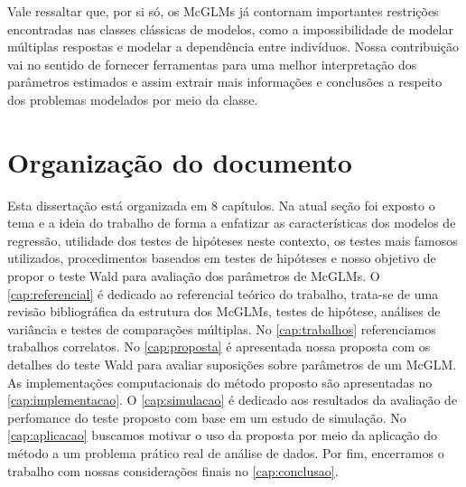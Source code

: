 Vale ressaltar que, por si só, os McGLMs já contornam importantes restrições encontradas nas classes clássicas de modelos, como a impossibilidade de modelar múltiplas respostas e modelar a dependência entre indivíduos. Nossa contribuição vai no sentido de fornecer ferramentas para uma melhor interpretação dos parâmetros estimados e assim extrair mais informações e conclusões a respeito dos problemas modelados por meio da classe.


\section{Organização do documento}

Esta dissertação está organizada em 8 capítulos. Na atual seção foi exposto o tema e a ideia do trabalho de forma a enfatizar as características dos modelos de regressão, utilidade dos testes de hipóteses neste contexto, os testes mais famosos utilizados, procedimentos baseados em testes de hipóteses e nosso objetivo de propor o teste Wald para avaliação dos parâmetros de McGLMs. O \autoref{cap:referencial} é dedicado ao referencial teórico do trabalho, trata-se de uma revisão bibliográfica da estrutura dos McGLMs, testes de hipótese, análises de variância e testes de comparações múltiplas. No \autoref{cap:trabalhos} referenciamos trabalhos correlatos. No \autoref{cap:proposta} é apresentada nossa proposta com os detalhes do teste Wald para avaliar suposições sobre parâmetros de um McGLM. As implementações computacionais do método proposto são apresentadas no \autoref{cap:implementacao}. O \autoref{cap:simulacao} é dedicado aos resultados da avaliação de perfomance do teste proposto com base em um estudo de simulação. No \autoref{cap:aplicacao} buscamos motivar o uso da proposta por meio da aplicação do método a um problema prático real de análise de dados. Por fim, encerramos o trabalho com nossas considerações finais no \autoref{cap:conclusao}.


